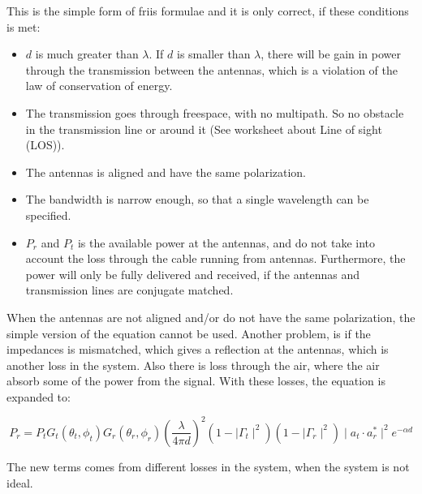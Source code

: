 This is the simple form of friis formulae and it is only correct, if these conditions is met:
\begin{itemize}
\item $d$ is much greater than $\lambda$. If $d$ is smaller than $\lambda$, there will be gain in power through the transmission between the antennas, which is a violation of the law of conservation of energy.
\item The transmission goes through freespace, with no multipath. So no obstacle in the transmission line or around it (See worksheet about Line of sight (LOS)).
\item The antennas is aligned and have the same polarization.
\item The bandwidth is narrow enough, so that a single wavelength can be specified.
\item $P_r$ and $P_t$ is the available power at the antennas, and do not take into account the loss through the cable running from antennas. Furthermore, the power will only be fully delivered and received, if the antennas and transmission lines are conjugate matched.
\end{itemize}


When the antennas are not aligned and/or do not have the same polarization, the simple version of the equation cannot be used. Another problem, is if the impedances is mismatched, which gives a reflection at the antennas, which is another loss in the system. Also there is loss through the air, where the air absorb some of the power from the signal. With these losses, the equation is expanded to:

\begin{equation}
P_r = P_t G_t(\theta_t, \phi_t) G_r(\theta_r, \phi_r) (\frac{\lambda}{4 \pi d})^2 (1 - \mid \Gamma_t \mid^2) (1 - \mid \Gamma_r \mid^2) \mid a_t \cdot a_r^* \mid^2 e^{- \alpha d}
\end{equation}
\begin{where}
\end{where}

The new terms comes from different losses in the system, when the system is not ideal.




